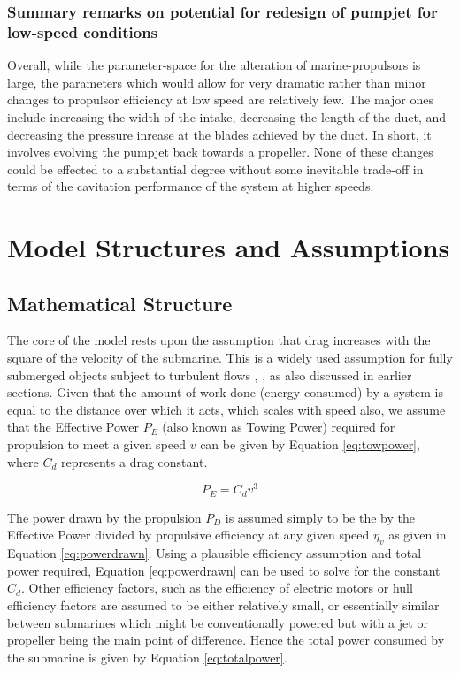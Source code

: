 \documentclass{article}\usepackage[]{graphicx}\usepackage[]{color}
\begin{document}
\subsubsection{Summary remarks on potential for redesign of pumpjet for low-speed conditions}
Overall, while the parameter-space for the alteration of marine-propulsors is large, the parameters which would allow for very dramatic rather than minor changes to propulsor efficiency at low speed are relatively few.  The major ones include increasing the width of the intake, decreasing the length of the duct, and decreasing the pressure inrease at the blades achieved by the duct.  In short, it involves evolving the pumpjet back towards a propeller.  None of these changes could be effected to a substantial degree without some inevitable trade-off in terms of the cavitation performance of the system at higher speeds.

\section{Model Structures and Assumptions}

\subsection{Mathematical Structure}

The core of the model rests upon the assumption that drag increases with the square of the velocity of the submarine.  This is a widely used assumption for fully submerged objects subject to turbulent flows \parencite[5]{wislicenus1973}, \parencite{davies2017}, as also discussed in earlier sections. Given that the amount of work done (energy consumed) by a system is equal to the distance over which it acts, which scales with speed also, we assume that the Effective Power $P_E$ (also known as Towing Power) required for propulsion to meet a given speed $v$ can be given by Equation \ref{eq:towpower}, where $C_d$ represents a drag constant.

\begin{equation}
\label{eq:towpower}
P_E = C_dv^3
\end{equation}

The power drawn by the propulsion $P_D$ is assumed simply to be the by the Effective Power divided by propulsive efficiency at any given speed $\eta_v$ as given in Equation \ref{eq:powerdrawn}.  Using a plausible efficiency assumption and total power required, Equation \ref{eq:powerdrawn} can be used to solve for the constant $C_d$.  Other efficiency factors, such as the efficiency of electric motors or hull efficiency factors are assumed to be either relatively small, or essentially similar between submarines which might be conventionally powered but with a jet or propeller being the main point of difference.  Hence the total power consumed by the submarine is given by Equation \ref{eq:totalpower}.
\end{document}
